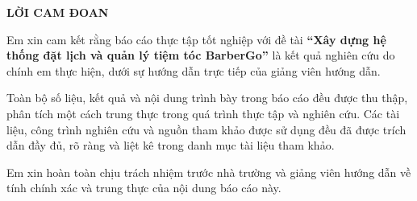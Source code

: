 
\begin{center}
    \textbf{\MakeUppercase{LỜI CAM ĐOAN}}
\end{center}

Em xin cam kết rằng báo cáo thực tập tốt nghiệp với đề tài
\textbf{“Xây dựng hệ thống đặt lịch và quản lý tiệm tóc BarberGo”}
là kết quả nghiên cứu do chính em thực hiện, dưới sự hướng dẫn trực tiếp của giảng viên hướng dẫn.

Toàn bộ số liệu, kết quả và nội dung trình bày trong báo cáo đều được thu thập, phân tích một cách trung thực trong quá trình thực tập và nghiên cứu. Các tài liệu, công trình nghiên cứu và nguồn tham khảo được sử dụng đều đã được trích dẫn đầy đủ, rõ ràng và liệt kê trong danh mục tài liệu tham khảo.

Em xin hoàn toàn chịu trách nhiệm trước nhà trường và giảng viên hướng dẫn về tính chính xác và trung thực của nội dung báo cáo này.


\clearpage
